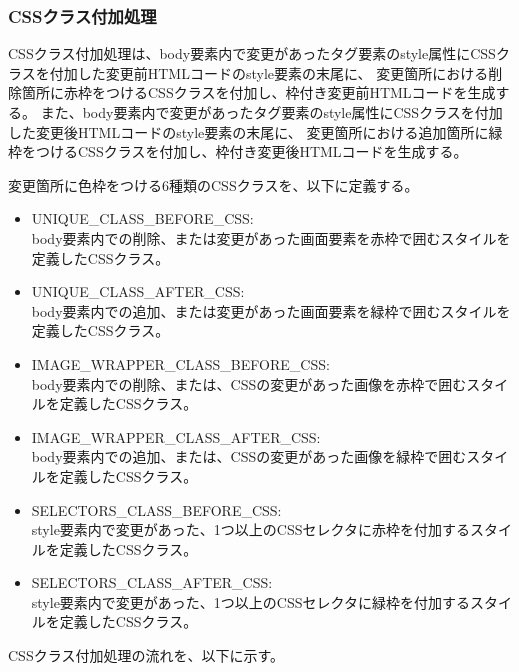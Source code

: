 \subsubsection{CSSクラス付加処理}\label{subsubsec: css_define}
CSSクラス付加処理は、body要素内で変更があったタグ要素のstyle属性にCSSクラス\cite{CssSelector}を付加した変更前HTMLコードのstyle要素の末尾に、
変更箇所における削除箇所に赤枠をつけるCSSクラスを付加し、枠付き変更前HTMLコードを生成する。
また、body要素内で変更があったタグ要素のstyle属性にCSSクラスを付加した変更後HTMLコードのstyle要素の末尾に、
変更箇所における追加箇所に緑枠をつけるCSSクラスを付加し、枠付き変更後HTMLコードを生成する。
\par
変更箇所に色枠をつける6種類のCSSクラスを、以下に定義する。
\begin{itemize}
    \setlength{\itemsep}{0pt}
          \setlength{\parsep}{0pt}
    \item UNIQUE\_CLASS\_BEFORE\_CSS:\\
          body要素内での削除、または変更があった画面要素を赤枠で囲むスタイルを定義したCSSクラス。
    \item UNIQUE\_CLASS\_AFTER\_CSS:\\
          body要素内での追加、または変更があった画面要素を緑枠で囲むスタイルを定義したCSSクラス。
    \item IMAGE\_WRAPPER\_CLASS\_BEFORE\_CSS:\\
          body要素内での削除、または、CSSの変更があった画像を赤枠で囲むスタイルを定義したCSSクラス。
    \item IMAGE\_WRAPPER\_CLASS\_AFTER\_CSS:\\
          body要素内での追加、または、CSSの変更があった画像を緑枠で囲むスタイルを定義したCSSクラス。
    \item SELECTORS\_CLASS\_BEFORE\_CSS:\\
          style要素内で変更があった、1つ以上のCSSセレクタに赤枠を付加するスタイルを定義したCSSクラス。
    \item SELECTORS\_CLASS\_AFTER\_CSS:\\
          style要素内で変更があった、1つ以上のCSSセレクタに緑枠を付加するスタイルを定義したCSSクラス。
\end{itemize}
\par
CSSクラス付加処理の流れを、以下に示す。

